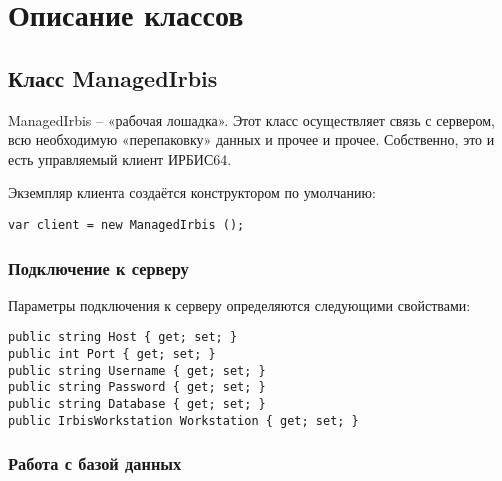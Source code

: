 \chapter{Описание классов}

\section{Класс ManagedIrbis}

ManagedIrbis – «рабочая лошадка». Этот класс осуществляет связь с сервером, всю необходимую «перепаковку» данных и прочее и прочее. Собственно, это и есть управляемый клиент ИРБИС64.

Экземпляр клиента создаётся конструктором по умолчанию:
\begin{lstlisting}
var client = new ManagedIrbis ();
\end{lstlisting}

\subsection{Подключение к серверу}

Параметры подключения к серверу определяются следующими свойствами:

\begin{lstlisting}
public string Host { get; set; }
public int Port { get; set; }
public string Username { get; set; }
public string Password { get; set; }
public string Database { get; set; }
public IrbisWorkstation Workstation { get; set; }
\end{lstlisting}

\subsection{Работа с базой данных}

